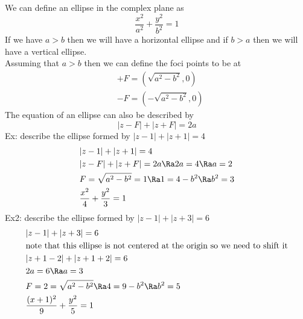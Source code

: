 We can define an ellipse in the complex plane as
\[
\frac{x^2}{a^2}+\frac{y^2}{b^2}=1
\]
If we have $a>b$ then we will have a horizontal ellipse and if $b>a$ then we will have a vertical ellipse.\\
Assuming that $a>b$ then we can define the foci points to be at
\begin{align*}
    &+F=(\sqrt{a^2-b^2}, 0)\\
    &-F=(-\sqrt{a^2-b^2}, 0)
\end{align*}
The equation of an ellipse can also be described by
\[
|z-F|+|z+F|=2a
\]
Ex: describe the ellipse formed by $|z-1|+|z+1|=4$
\begin{align*}
    &|z-1|+|z+1|=4\\
    &|z-F|+|z+F|=2a\Ra 2a=4\Ra a=2\\
    &F=\sqrt{a^2-b^2}=1\Ra 1=4-b^2\Ra b^2=3\\
    &\frac{x^2}{4}+\frac{y^2}{3}=1
\end{align*}
Ex2: describe the ellipse formed by $|z-1|+|z+3|=6$
\begin{align*}
    &|z-1|+|z+3|=6\\
    &\text{note that this ellipse is not centered at the origin so we need to shift it}\\
    &|z+1-2|+|z+1+2|=6\\
    &2a=6\Ra a=3\\
    &F=2=\sqrt{a^2-b^2}\Ra 4=9-b^2\Ra b^2=5\\
    &\frac{(x+1)^2}{9}+\frac{y^2}{5}=1
\end{align*}

